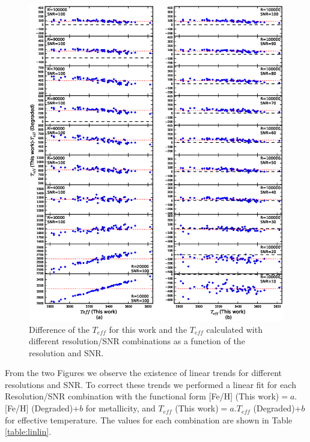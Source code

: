 \documentclass[referee]{aa}
\begin{document}
\begin{figure}[h!]
\begin{center}
\includegraphics[scale=0.9]{pics/resnr_teffv2.eps}
\end{center}
\caption{Difference of the $T_{eff}$ for this work and the $T_{eff}$ calculated with different resolution/SNR combinations as a function of the resolution and SNR.}
\label{fig:resnr-teff}
\end{figure}


From the two Figures we observe the existence of linear trends for different resolutions and SNR. To correct these trends we performed a linear fit for each Resolution/SNR combination with the functional form [Fe/H] (This work)$ = a.$[Fe/H] (Degraded)+$b$ for metallicity, and 
$T_{eff}$ (This work)$ = a.T_{eff}$ (Degraded)+$b$ for effective temperature. The values for each combination are shown in Table \ref{table:linlin}.
\end{document}

